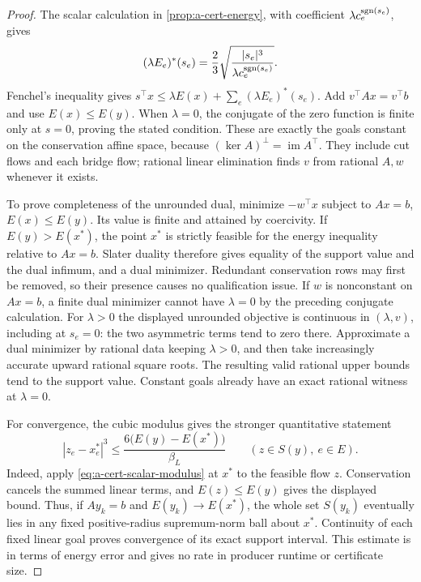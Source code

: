 \begin{proof}
The scalar calculation in \cref{prop:a-cert-energy}, with coefficient
$\lambda c_e^{\operatorname{sgn}(s_e)}$, gives
\[
 (\lambda E_e)^*(s_e)=
 \frac23\sqrt{\frac{|s_e|^3}{\lambda c_e^{\operatorname{sgn}(s_e)}}}.
\]
Fenchel's inequality gives $s^\top x\le\lambda E(x)+
\sum_e(\lambda E_e)^*(s_e)$. Add $v^\top Ax=v^\top b$
and use $E(x)\le E(y)$. When $\lambda=0$, the conjugate
of the zero function is finite only at $s=0$, proving the stated
condition. These are exactly the goals constant on the conservation
affine space, because $(\ker A)^\perp=\operatorname{im}A^\top$.
They include cut flows and each bridge flow; rational linear elimination
finds $v$ from rational $A,w$ whenever it exists.

To prove completeness of the unrounded dual, minimize $-w^\top x$ subject
to $Ax=b$, $E(x)\le E(y)$. Its value is finite and attained by
coercivity. If $E(y)>E(x^*)$, the point $x^*$ is strictly feasible
for the energy inequality relative to $Ax=b$. Slater duality
therefore gives equality of the support value and the dual infimum,
and a dual minimizer. Redundant conservation rows may first be
removed, so their presence causes no qualification issue.
If $w$ is nonconstant on $Ax=b$, a finite dual minimizer cannot
have $\lambda=0$ by the preceding conjugate calculation.
For $\lambda>0$ the displayed unrounded objective is continuous in
$(\lambda,v)$, including at $s_e=0$: the two asymmetric terms tend
to zero there. Approximate a dual minimizer by rational data keeping
$\lambda>0$, and then take increasingly accurate upward rational
square roots. The resulting valid rational upper bounds tend to the
support value. Constant goals already have an exact rational witness
at $\lambda=0$.

For convergence, the cubic modulus gives the stronger quantitative
statement
\[
 |z_e-x_e^*|^3
 \le \frac{6\bigl(E(y)-E(x^*)\bigr)}{\beta_L}
 \qquad(z\in S(y),\ e\in E).
\]
Indeed, apply \eqref{eq:a-cert-scalar-modulus} at $x^*$ to the
feasible flow $z$. Conservation cancels the summed linear terms, and
$E(z)\le E(y)$ gives the displayed bound. Thus, if $Ay_k=b$ and
$E(y_k)\to E(x^*)$, the whole set $S(y_k)$ eventually lies in any
fixed positive-radius supremum-norm ball about $x^*$. Continuity of
each fixed linear goal proves convergence of its exact support interval.
This estimate is in terms of energy error and gives no rate in
producer runtime or certificate size.
\end{proof}

